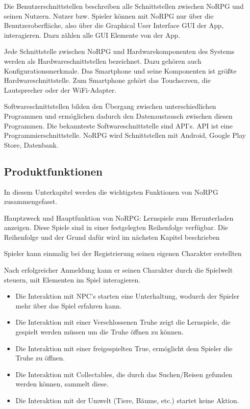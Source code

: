 		Die Benutzerschnittstellen beschreiben alle Schnittstellen zwischen NoRPG und seinen Nutzern. Nutzer bzw. Spieler können mit NoRPG nur über die Benutzeroberfläche, also über die Graphical User Interface GUI der App, interagieren. Dazu zählen alle GUI Elemente von der App.
		
		Jede Schnittstelle zwischen NoRPG und Hardwarekomponenten des Systems werden als Hardwareschnittstellen bezeichnet. Dazu gehören auch Konfigurationsmerkmale. Das Smartphone und seine Komponenten ist größte Hardwareschnittstelle. Zum Smartphone gehört das Touchscreen, die Lautsprecher oder der WiFi-Adapter. %
		
		Softwareschnittstellen bilden den Übergang zwischen unterschiedlichen Programmen und ermöglichen dadurch den Datenaustausch zwischen diesen Programmen. Die bekannteste Softwareschnittstelle sind API's. API ist eine Programmierschnittstelle. NoRPG wird Schnittstellen mit Android, Google Play Store, Datenbank.

	\subsection{Produktfunktionen}
		In diesem Unterkapitel werden die wichtigsten Funktionen von NoRPG zusammengefasst.
		
		Hauptzweck und Hauptfunktion von NoRPG: Lernspiele zum Herunterladen anzeigen. Diese Spiele sind in einer festgelegten Reihenfolge verfügbar. Die Reihenfolge und der Grund dafür wird im nächsten Kapitel beschrieben
		
		Spieler kann einmalig bei der Registrierung seinen eigenen Charakter erstellten 
		
		Nach erfolgreicher Anmeldung kann er seinen Charakter durch die Spielwelt steuern, mit Elementen im Spiel interagieren.
		
		\begin{itemize}
			\item{Die Interaktion mit NPC's starten eine Unterhaltung, wodurch der Spieler mehr über das Spiel erfahren kann.}
			\item{Die Interaktion mit einer Verschlossenen Truhe zeigt die Lernspiele, die gespielt werden müssen um die Truhe öffnen zu können.}
			\item{Die Interaktion mit einer freigespielten True, ermöglicht dem Spieler die Truhe zu öffnen.}
			\item{Die Interaktion mit Collectables, die durch das Suchen/Reisen gefunden werden können, sammelt diese.}
			\item{Die Interaktion mit der Umwelt (Tiere, Bäume, etc.) startet keine Aktion.}
		\end{itemize}
		
